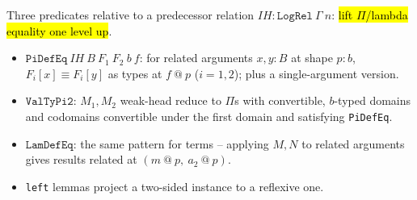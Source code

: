 \begin{definition}
\label{def:expa-lrs-components}
\leanok
{}
 Three predicates relative to a predecessor relation $\mathit{IH}:\mathtt{LogRel}\
\Gamma\ n$: \hl{lift $\Pi$/lambda equality one level up}.
\begin{itemize}
\item $\mathtt{PiDefEq}\ \mathit{IH}\ B\ F_1\ F_2\ b\ f$: for related arguments $x,y:B$ at shape
$p:b$, $F_i[x]\equiv F_i[y]$ as types at $f\ @\ p$ ($i=1,2$); plus a single-argument version.
\item $\mathtt{ValTyPi2}$: $M_1,M_2$ weak-head reduce to $\Pi$s with convertible, $b$-typed domains
and codomains convertible under the first domain and satisfying \texttt{PiDefEq}.
\item $\mathtt{LamDefEq}$: the same pattern for terms -- applying $M,N$ to related arguments gives
results related at $(m\ @\ p,\ a_2\ @\ p)$.
\item \texttt{left} lemmas project a two-sided instance to a reflexive one.
\end{itemize}
\end{definition}

